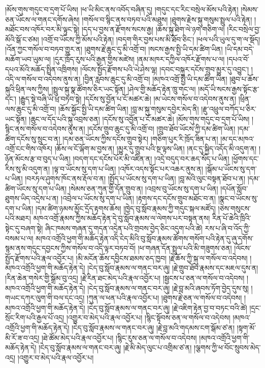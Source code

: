\documentclass{article}
\begin{document}
།མོས་གུས་གདུང་བ་དྲག་པོ་ཡིས། །ཕ་ཡི་མིང་ནས་འབོད་བཞིན་དུ། །གདུང་དང་རིང་བསྲེལ་མོས་པའི་རྟེན། །སེམས་ཅན་ཡོངས་ལ་གནང་དགོས་ཞེས། །གསོལ་བ་སྙིང་ནས་བཏབ་པའི་མཐུས། །ཐུགས་རྗེས་སྐུ་གསུམ་སྤྲུལ་པའི་རྟེན། །མཐོང་བས་འཁོར་བར་མི་ལྟུང་སྟེ། །དད་པ་བྱས་ན་རྫོགས་སངས་རྒྱ། །ཆོས་སྐུ་ཐིག་ལེ་ཉག་གཅིག་ལ། །རིང་བསྲེལ་བྱ་མོའི་སྒོ་ང་ཙམ། །འགྲོ་བ་ཡོངས་ཀྱི་མོས་པའི་རྟེན། །བདག་གིར་བྱས་པས་མི་ཐོབ་ཅིང་། །ཕལ་པའི་ཡུལ་དུ་ག་ལ་སྡོད། །འོན་ཀྱང་གསོལ་བ་བཏབ་གྱུར་ན། །ཐུགས་རྗེ་ཆུང་དུ་མི་འགྲོ་བ། །སངས་རྒྱས་སྤྱི་ཡི་དམ་ཚིག་ཡིན། །ཡི་དམ་བདེ་མཆོག་ཡབ་ཡུམ་ལ། །དུར་ཁྲོད་རུས་པའི་རྒྱན་གྱིས་མཛེས། །ནམ་མཁར་དཀྱིལ་འཁོར་རྫོགས་པ་ལ། །དཔའ་བོ་དཔའ་མོའི་མཆོད་སྤྲིན་འཁྲིགས། །ལོངས་སྤྱོད་རྫོགས་པའི་ཡེ་ཤེས་ལྷ། །དབང་བསྐུར་དངོས་གྲུབ་མྱུར་དུ་འབྱུང་། །འདི་ལ་གསོལ་བ་འདེབས་ནུས་ན། །བྱིན་རླབས་ཆུང་དུ་མི་འགྲོ་བ། །མཁའ་འགྲོ་སྤྱི་ཡི་དམ་ཚིག་ཡིན། །ཐུབ་པ་ཆོས་སྐུའི་ཕྲིན་ལས་ཀྱིས། །སྤྲུལ་སྐུ་སྣ་ཚོགས་ཅིར་ཡང་སྟོན། །ཤེལ་གྱི་མཆོད་རྟེན་ཁྲུ་གང་ལ། །མདོ་ཡི་སངས་རྒྱས་སྟོང་རྩ་དང་། །རྒྱུད་སྡེ་བཞི་ཡི་ཕྲ་བཏབ་སྟེ། །དངོས་སུ་བྱོན་པ་ངོ་མཚར་ཆེ། །མ་ཡེངས་གསོལ་བ་འདེབས་ནུས་ན། །ཕྲིན་ལས་ཆུང་དུ་མི་འགྲོ་བ། །ཆོས་སྐྱོང་སྤྱི་ཡི་དམ་ཚིག་ཡིན། །བླ་མ་སྐུ་གསུམ་དབྱེར་མེད་ནི། །རྫུ་འཕྲུལ་བཀོད་པ་ཅིར་ཡང་སྟོན། །ཆུང་ལ་དོད་པའི་སྐུ་འབྲས་ཅན། །དངོས་སུ་འབྱོན་པ་ངོ་མཚར་ཆེ། །མོས་གུས་གདུང་བ་དྲག་པོ་ཡིས། །སྙིང་ནས་གསོལ་བ་འདེབས་ནུས་ན། །དངོས་གྲུབ་ཆུང་དུ་མི་འགྲོ་བ། །གྲུབ་ཐོབ་ཡོངས་ཀྱི་དམ་ཚིག་ཡིན། །དམ་ཚིག་དངོས་སུ་སྲུང་བ་ན། །དམ་ཅན་ཡོངས་ཀྱིས་དངོས་གྲུབ་སྟེར། །གཅིག་པུར་རི་ཁྲོད་ཟིན་པ་ན། །མ་དང་མཁའ་འགྲོ་ངང་གིས་འཁོར། །ཆོས་ལ་ངོ་ལྐོག་མ་བྱས་ན། །མྱུར་དུ་གྲུབ་པའི་སྔ་ལྟས་ཡིན། །ནང་དུ་སྐྱིད་འདོད་མི་འདུག་ན། །ཉོན་མོངས་རྩ་བ་བུད་པ་ཡིན། །བདག་དང་དངོས་པོར་མི་འཛིན་ན། །འདྲེ་བདུད་བར་ཆད་སོད་པ་ཡིན། །ཕྱོགས་དང་རིས་སུ་མི་འདུག་ན། །ལྟ་བ་ཡོངས་སུ་དག་པ་ཡིན། །འཁོར་འདས་སྟོང་པར་འཆར་ནུས་ན། །སྒོམ་པ་ཡོངས་སུ་དག་པ་ཡིན། །བརཏལ་ཤུགས་ཁོང་ནས་རྡོལ་བ་ན། །སྤྱོད་པ་ཡོངས་སུ་དག་པ་ཡིན། །བླ་མའི་ལུང་བསྟན་ཐོབ་པ་ན། །དམ་ཚིག་ཡོངས་སུ་དག་པ་ཡིན། །སེམས་ཅན་ཀུན་གྱི་དོན་གྲུབ་ན། །འབྲས་བུ་ཡོངས་སུ་དག་པ་ཡིན། །དཔོན་སློབ་ཐུགས་ཡིད་འདྲེས་པ་ན། །འབྲེལ་པ་ཡོངས་སུ་དག་པ་ཡིན། །རྟགས་དང་དངོས་གྲུབ་མཐོང་བ་ན། །སྣང་བ་ཡོངས་སུ་དག་པ་ཡིན། །དམ་ཚིག་ཉམས་མྱོང་དྲོད་རྟགས་ཆོས། །ཁྱེད་བུ་སློབ་རྣམས་ཀྱི་གདུང་སྐལ་མཛོད། །ཅེས་གསུངས་པའི་མཐར། མཁའ་འགྲོ་རྣམས་ཀྱིས་མཆོད་རྟེན་དེ་བུ་སློབ་རྣམས་ལ་ལེགས་པར་བསྟན་ནས། རིན་པོ་ཆེའི་ཁྲིའི་སྟེང་དུ་བཞག་སྟེ། ཞིང་ཁམས་གཞན་དུ་གདན་འདྲེན་པའི་གྲབས་བྱེད་ཅིང་འདུག་པའི་ཚེ། རས་པ་ཞི་བ་འོད་ཀྱི་བསམ་པ་ལ། མཁའ་འགྲོའི་ཕྱག་གི་མཆོད་རྟེན་འདི་ངེད་མིའི་བུ་སློབ་རྣམས་ཚོགས་གསོག་པའི་རྟེན་དུ་ཞུ་དགོས་སྙམ་ནས་གདུང་དབྱངས་ཀྱིས་གསོལ་བ་འདི་ལྟར་བཏབ་བོ། །ཕ་གཞན་དོན་སྤྲུལ་པའི་མི་གཟུགས་ཅན། །ལོངས་སྤྱོད་རྫོགས་པའི་རྣལ་འབྱོར་པ། །མི་མངོན་ཆོས་དབྱིངས་ཐམས་ཅད་ཁྱབ། །རྗེ་ཆོས་ཀྱི་སྐུ་ལ་གསོལ་བ་འདེབས། །མཁའ་འགྲོའི་ཕྱག་གི་མཆོད་རྟེན་དེ། །ངེད་བུ་སློབ་རྣམས་ལ་གནང་བར་ཞུ། །རྗེ་གྲུབ་ཐོབ་རྣམས་དང་མཇལ་དུས་ན། །རིན་ཆེན་གསེར་གྱི་སྒྲོམ་བུ་འདྲ། །རྗེ་རིན་ཐང་མེད་པའི་རྣལ་འབྱོར་པ། །སྦྱངས་པ་ཅན་ལ་གསོལ་བ་འདེབས། །མཁའ་འགྲོའི་ཕྱག་གི་མཆོད་རྟེན་དེ། །ངེད་བུ་སློབ་རྣམས་ལ་གནང་བར་ཞུ། །རྗེ་བླ་མའི་ཞབས་ཏོག་བྱེད་དུས་སུ། །གཡང་དཀར་ལུག་གི་བལ་དང་འདྲ། །ཀུན་ལ་ཕན་པའི་རྣལ་འབྱོར་པ། །ཐུགས་རྗེ་ཅན་ལ་གསོལ་བ་འདེབས། །མཁའ་འགྲོའི་ཕྱག་གི་མཆོད་རྟེན་དེ། །ངེད་བུ་སློབ་རྣམས་ལ་གནང་བར་ཞུ། །རྗེ་འཇིག་རྟེན་བྱ་བ་བཏང་བའི་ཚེ། །དྲང་སྲོང་རིག་པའི་རྒྱལ་པོ་འདྲ། །འགྱུར་བ་མེད་པའི་རྣལ་འབྱོར་པ། །སྙིང་སྟོབས་ཅན་ལ་གསོལ་བ་འདེབས། །མཁའ་འགྲོའི་ཕྱག་གི་མཆོད་རྟེན་དེ། །ངེད་བུ་སློབ་རྣམས་ལ་གནང་བར་ཞུ། །རྗེ་བླ་མའི་གདམས་ངག་སྒོམ་ཙ་ན། །སྟག་མོ་མི་རོ་ཟ་བ་འདྲ། །ཐེ་ཚོམ་མེད་པའི་རྣལ་འབྱོར་པ། །སྙིང་རུས་ཅན་ལ་གསོལ་བ་འདེབས། །མཁའ་འགྲོའི་ཕྱག་གི་མཆོད་རྟེན་དེ། །ངེད་བུ་སློབ་རྣམས་ལ་གནང་བར་ཞུ། །རྗེ་མི་མེད་ལུང་པ་འགྲིམ་ཙ་ན། །ལྕགས་ཀྱི་ཕ་བོང་སྲུབས་མེད་འདྲ། །འགྱུར་བ་མེད་པའི་རྣལ་འབྱོར་པ། 
\end{document}
